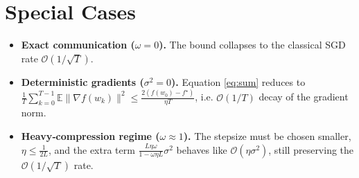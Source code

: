 \documentclass{article}
\newcommand{\E}{\mathbb{E}}
\begin{document}
\section*{Special Cases}
\begin{itemize}
    \item \textbf{Exact communication ($\omega=0$).} The bound collapses to the classical SGD rate $\mathcal{O}(1/\sqrt{T})$.
    \item \textbf{Deterministic gradients ($\sigma^{2}=0$).} Equation \eqref{eq:sum} reduces to 
    $\frac{1}{T}\sum_{k=0}^{T-1}\E\|\nabla f(w_k)\|^{2}\le\frac{2(f(w_0)-f^{\star})}{\eta T}$,
    i.e. $\mathcal{O}(1/T)$ decay of the gradient norm.
    \item \textbf{Heavy‑compression regime ($\omega\approx 1$).} The stepsize must be chosen smaller, $\eta\le\frac{1}{2L}$, and the extra term $\frac{L\eta\omega}{1-\omega\eta L}\sigma^{2}$ behaves like $\mathcal{O}(\eta\sigma^{2})$, still preserving the $\mathcal{O}(1/\sqrt{T})$ rate.
\end{itemize}
\end{document}
